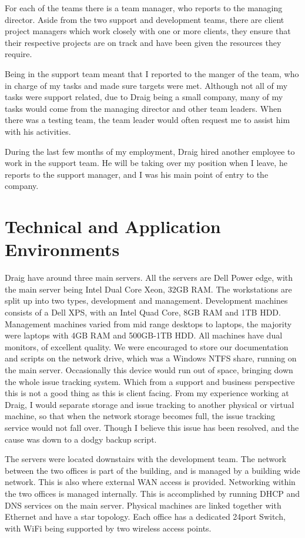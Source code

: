 \documentclass[paper=a4, fontsize=11pt]{scrartcl}	%
\begin{document}
For each of the teams there is a team manager, who reports to the managing director.  Aside from the two support and development teams, there are client project managers which work closely with one or more clients, they ensure that their respective projects are on track and have been given the resources they require.

Being in the support team meant that I reported to the manger of the team, who in charge of my tasks and made sure targets were met. Although not all of my tasks were support related, due to Draig being a small company, many of my tasks would come from the managing director and other team leaders. When there was a testing team, the team leader would often request me to assist him with his activities.

During the last few months of my employment, Draig hired another employee to work in the support team. He will be taking over my position when I leave, he reports to the support manager, and I was his main point of entry to the company.

\section{Technical and Application Environments}
Draig have around three main servers. All the servers are Dell Power edge, with the main server being Intel Dual Core Xeon, 32GB RAM. The workstations are split up into two types, development and management. Development machines consists of a Dell XPS, with an Intel Quad Core, 8GB RAM and 1TB HDD. Management machines varied from mid range desktops to laptops, the majority were laptops with 4GB RAM and 500GB-1TB HDD. All machines have dual monitors, of excellent quality. We were encouraged to store our documentation and scripts on the network drive, which was a Windows NTFS share, running on the main server. Occasionally this device would run out of space, bringing down the whole issue tracking system. Which from a support and business perspective this is not a good thing as this is client facing. From my experience working at Draig, I would separate storage and issue tracking to another physical or virtual machine, so that when the network storage becomes full, the issue tracking service would not fall over. Though I believe this issue has been resolved, and the cause was down to a dodgy backup script. 

The servers were located downstairs with the development team. The network between the two offices is part of the building, and is managed by a building wide network. This is also where external WAN access is provided. Networking within the two offices is managed internally. This is accomplished by running DHCP and DNS services on the main server. Physical machines are linked together with Ethernet and have a star topology. Each office has a dedicated 24port Switch, with WiFi being supported by two wireless access points.
\end{document}
